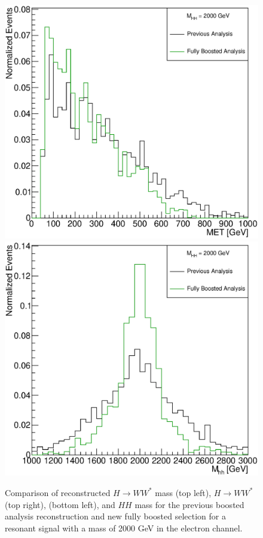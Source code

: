 \begin{figure}[h]
\begin{center}
\includegraphics[scale=0.25]{figures/WHad_plots_john_withcuts/electron/wlep_met_Xhh2000}
\includegraphics[scale=0.25]{figures/WHad_plots_john_withcuts/electron/hh_m_Xhh2000}
\caption[Comparison of ${H\rightarrow WW^{*}}$ mass, ${H\rightarrow WW^{*}}$ \pt, \met , and $HH$ mass for the electron channel]{Comparison of reconstructed ${H\rightarrow WW^{*}}$ mass (top left), ${H\rightarrow WW^{*}}$ \pt (top right), \met (bottom left), and $HH$ mass for the  previous boosted analysis reconstruction and new fully boosted selection for a resonant signal with a mass of 2000 GeV in the electron channel.}
\label{fig:elec_sel}
\end{center}
\end{figure}

